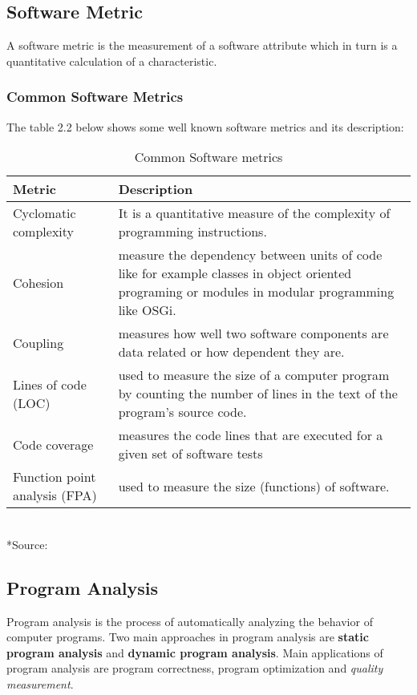 \subsection{Software Metric}
A software metric is the measurement of a software attribute which in turn is a quantitative calculation of a characteristic.
\subsubsection{Common Software Metrics}
The table 2.2 below shows some well known software metrics and its description:

\begin{table}[h]
\caption{Common Software metrics}
\begin{center}
    \begin{tabular}{  p{3cm} | p{8cm} }
    \hline
    Metric & Description \\  \hline
    Cyclomatic complexity & It is a quantitative measure of the complexity of programming instructions.\\ \hline
    Cohesion & measure the dependency between units of code like for example classes in object oriented programing or modules in modular programming like OSGi. \\ \hline
    Coupling & measures how well two software components are data related or how dependent they are. \\ \hline
    Lines of code (LOC) & used to measure the size of a computer program by counting the number of lines in the text of the program's source code. \\ \hline
    Code coverage &  measures the code lines that are executed for a given set of software tests \\ \hline
    Function point analysis (FPA) & used to measure the size (functions) of software. \\
    \hline

    \end{tabular}
    \\*Source: \cite{sqa 2012}
\end{center}
\end{table}

\FloatBarrier

\subsection{Program Analysis}
Program analysis is the process of automatically analyzing the behavior of computer programs. Two main approaches in program analysis are \textbf{static program analysis} and \textbf{dynamic program analysis}. Main applications of program analysis are program correctness, program optimization and \textit{quality measurement}.

